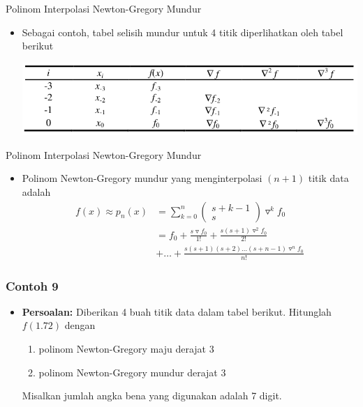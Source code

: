\documentclass[pdflatex,compress,mathserif]{beamer}
\begin{document}
\begin{frame}{Polinom Interpolasi Newton-Gregory Mundur}
	\begin{itemize}
		\item Sebagai contoh, tabel selisih mundur untuk 4 titik diperlihatkan oleh tabel berikut
		\begin{center}
			\includegraphics[width=\linewidth]{img/img26}
		\end{center}
	\end{itemize}
\end{frame}

\begin{frame}{Polinom Interpolasi Newton-Gregory Mundur}
	\begin{itemize}
		\item Polinom Newton-Gregory mundur yang menginterpolasi $ (n+1) $ titik data adalah
		\begin{align*}
			f(x) \approx p_n(x) &= \sum_{k=0}^{n} \left(\begin{matrix}
			s+k-1 \\ s
			\end{matrix}\right) \triangledown ^k f_0 \\
			&= f_0 + \frac{s\triangledown f_0}{1!} + \frac{s(s+1)\triangledown^2 f_0}{2!} \\
			&+ \dots + \frac{s(s+1)(s+2)\dots(s+n-1)\triangledown^n f_0}{n!}
		\end{align*}
	\end{itemize}
\end{frame}

\begin{frame}
	\frametitle{Contoh 9}
	\begin{itemize}
		\item \textbf{Persoalan:} Diberikan 4 buah titik data dalam tabel berikut. Hitunglah $ f(1.72) $ dengan
		\begin{enumerate}
			\item polinom Newton-Gregory maju derajat 3
			\item polinom Newton-Gregory mundur derajat 3
		\end{enumerate}
		Misalkan jumlah angka bena yang digunakan adalah 7 digit.
	\end{itemize}
\end{frame}
\end{document}
